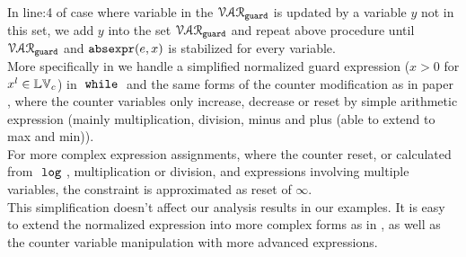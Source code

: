   In line:4 of case where variable in the $\mathcal{VAR}_{\mathtt{guard}}$ is updated by a variable $y$ not in this set, we add $y$ into the set $\mathcal{VAR}_{\mathtt{guard}}$ and repeat 
  above procedure  until $\mathcal{VAR}_{\mathtt{guard}}$ and $\mathtt{abs}{\mathtt{expr}}(e, x)$ is stabilized for every variable.
  \\
More specifically in 
we handle a simplified normalized guard expression ($ x > 0$ for $x^l \in \mathbb{LV}_c$)
 in $\;\mathtt{while}\;$ and the same forms of the counter modification as in paper \cite{sinn2017complexity}
, where the counter variables only increase, decrease or reset by 
simple arithmetic expression (mainly multiplication, division, minus and plus (able to extend to max and min)).
\\
For more complex expression assignments, where the counter reset, or calculated from $~\mathtt{log}~$, 
multiplication or division, and expressions involving multiple variables, the constraint is approximated as reset of $\infty$.
\\
This simplification doesn't affect our analysis results in our examples. It is easy to extend the normalized expression 
into more complex forms as in \cite{sinn2017complexity}, as well as the 
counter variable manipulation with more advanced expressions.
